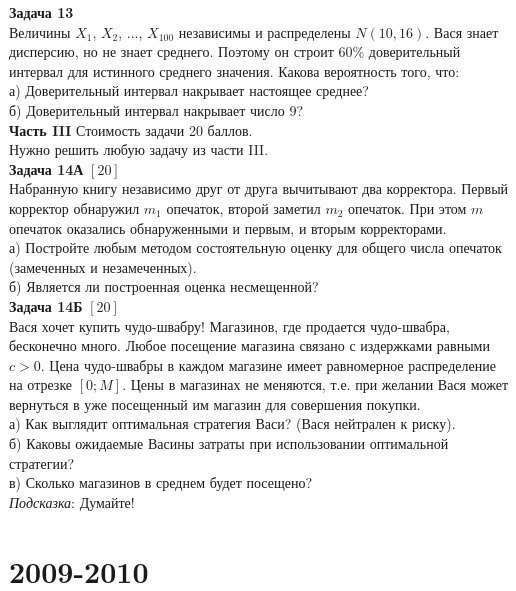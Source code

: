 \documentclass[12pt, a4paper]{article}\usepackage[]{graphicx}\usepackage[]{color}
\begin{document}
	\textbf{Задача 13} \\
	Величины $X_{1}$, $X_{2}$, ..., $X_{100}$ независимы и распределены $N(10,16)$. Вася знает дисперсию, но не знает среднего. Поэтому он строит 60\% доверительный интервал для истинного среднего значения. Какова вероятность того, что:\\
	а) Доверительный интервал накрывает настоящее среднее? \\
	б) Доверительный интервал накрывает число 9? \\

	\textbf{Часть III} Стоимость задачи 20 баллов. \\

	Нужно решить любую \textbf{} задачу из части III. \\


	\textbf{Задача 14А} $[20]$ \\
	Набранную книгу независимо друг от друга вычитывают два корректора. Первый корректор обнаружил $m_{1}$ опечаток, второй заметил $m_{2}$ опечаток. При этом $m$ опечаток оказались обнаруженными и первым, и вторым корректорами. \\
	а) Постройте любым методом состоятельную оценку для общего числа опечаток (замеченных и незамеченных). \\
	б) Является ли построенная оценка несмещенной? \\


	\textbf{Задача 14Б} $[20]$ \\
	Вася хочет купить чудо-швабру! Магазинов, где продается чудо-швабра, бесконечно много. Любое посещение магазина связано с издержками равными $c>0$. Цена чудо-швабры в каждом магазине имеет равномерное распределение на отрезке $[0;M]$. Цены в магазинах не меняются, т.е. при желании Вася может вернуться в уже посещенный им магазин для совершения покупки.\\
	а) Как выглядит оптимальная стратегия Васи? (Вася нейтрален к риску). \\
	б) Каковы ожидаемые Васины затраты при использовании оптимальной стратегии? \\
	в) Сколько магазинов в среднем будет посещено? \\


	\emph{Подсказка}: Думайте! \\





	\section{2009-2010}
\end{document}
